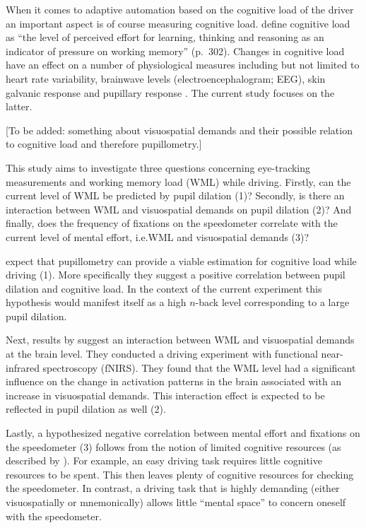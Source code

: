 When it comes to adaptive automation based on the cognitive load of the driver an important aspect is of course measuring cognitive load.
\citet{Haapalainen2010} define cognitive load as ``the level of perceived effort for learning, thinking and reasoning as an indicator of pressure on working memory'' (p.~302).
Changes in cognitive load have an effect on a number of physiological measures including but not limited to heart rate variability, brainwave levels (electroencephalogram; EEG), skin galvanic response and pupillary response \citep{Haapalainen2010}.
The current study focuses on the latter.

[To be added: something about visuospatial demands and their possible relation to cognitive load and therefore pupillometry.]

This study aims to investigate three questions concerning eye-tracking measurements and working memory load (WML) while driving. 
Firstly, can the current level of WML be predicted by pupil dilation (1)? 
Secondly, is there an interaction between WML and visuospatial demands on pupil dilation (2)?
And finally, does the frequency of fixations on the speedometer correlate with the current level of mental effort, i.e.\@ WML and visuospatial demands (3)?

\citet{Palinko2010} expect that pupillometry can provide a viable estimation for cognitive load while driving (1). 
More specifically they suggest a positive correlation between pupil dilation and cognitive load.
In the context of the current experiment this hypothesis would manifest itself as a high \(n\)-back level corresponding to a large pupil dilation.

Next, results by \citet{Scheunemann2019} suggest an interaction between WML and visuospatial demands at the brain level. 
They conducted a driving experiment with functional near-infrared spectroscopy (fNIRS).
They found that the WML level had a significant influence on the change in activation patterns in the brain associated with an increase in visuospatial demands.
This interaction effect is expected to be reflected in pupil dilation as well (2).

Lastly, a hypothesized negative correlation between mental effort and fixations on the speedometer (3) follows from the notion of limited cognitive resources (as described by \citet{DeWaard1996}).
For example, an easy driving task requires little cognitive resources to be spent.
This then leaves plenty of cognitive resources for checking the speedometer.
In contrast, a driving task that is highly demanding (either visuospatially or mnemonically) allows little ``mental space'' to concern oneself with the speedometer.

